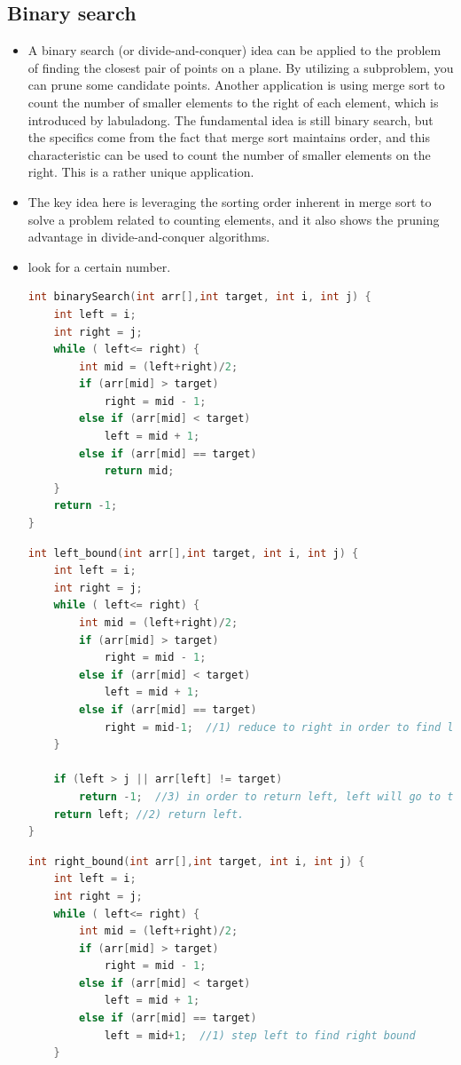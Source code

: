 \documentclass[a4paper,11pt,twoside]{book}
\begin{document}
\subsection{Binary search}
\begin{itemize}
	
\item	A binary search (or divide-and-conquer) idea can be applied to the problem of finding the closest pair of points on a plane. By utilizing a subproblem, you can prune some candidate points. Another application is using merge sort to count the number of smaller elements to the right of each element, which is introduced by labuladong. The fundamental idea is still binary search, but the specifics come from the fact that merge sort maintains order, and this characteristic can be used to count the number of smaller elements on the right. This is a rather unique application.
	
\item	The key idea here is leveraging the sorting order inherent in merge sort to solve a problem related to counting elements, and it also shows the pruning advantage in divide-and-conquer algorithms.
	
	\item look for a certain number. 

\begin{lstlisting}[frame=single, language=c++]
int binarySearch(int arr[],int target, int i, int j) {
	int left = i;
	int right = j;
	while ( left<= right) {
		int mid = (left+right)/2;
		if (arr[mid] > target)
			right = mid - 1;
		else if (arr[mid] < target)
			left = mid + 1;
		else if (arr[mid] == target)
			return mid;
	}
	return -1;
} 
\end{lstlisting}

\begin{lstlisting}[frame=single, language=c++]
int left_bound(int arr[],int target, int i, int j) {
	int left = i;
	int right = j;
	while ( left<= right) {
		int mid = (left+right)/2;
		if (arr[mid] > target)
			right = mid - 1;
		else if (arr[mid] < target)
			left = mid + 1;
		else if (arr[mid] == target)
			right = mid-1;  //1) reduce to right in order to find left bound
	}
	
	if (left > j || arr[left] != target)
		return -1;  //3) in order to return left, left will go to the right boundary, 
	return left; //2) return left.   
}
\end{lstlisting}	


\begin{lstlisting}[frame=single, language=c++]
int right_bound(int arr[],int target, int i, int j) {
	int left = i;
	int right = j;
	while ( left<= right) {
		int mid = (left+right)/2;
		if (arr[mid] > target)
			right = mid - 1;
		else if (arr[mid] < target)
			left = mid + 1;
		else if (arr[mid] == target)
			left = mid+1;  //1) step left to find right bound
	}
	

\end{lstlisting}
\end{itemize}
\end{document}
